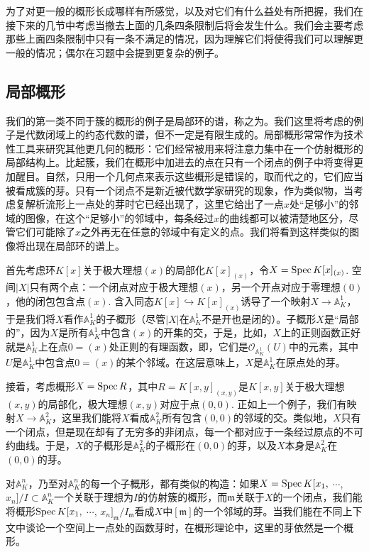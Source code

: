 为了对更一般的概形长成哪样有所感觉，以及对它们有什么益处有所把握，我们在接下来的几节中考虑当撤去上面的几条四条限制后将会发生什么。我们会主要考虑那些上面四条限制中只有一条不满足的情况，因为理解它们将使得我们可以理解更一般的情况；偶尔在习题中会提到更复杂的例子。

\subsection{局部概形}

我们的第一类不同于簇的概形的例子是局部环的谱，称之为。我们这里将考虑的例子是代数闭域上的约态代数的谱，但不一定是有限生成的。局部概形常常作为技术性工具来研究其他更几何的概形：它们经常被用来将注意力集中在一个仿射概形的局部结构上。比起簇，我们在概形中加进去的点在只有一个闭点的例子中将变得更加醒目。自然，只用一个几何点来表示这些概形是错误的，取而代之的，它们应当被看成簇的芽。只有一个闭点不是新近被代数学家研究的现象，作为类似物，当考虑复解析流形上一点处的芽时它已经出现了，这里它给出了一点$x$处“足够小”的邻域的图像，在这个“足够小”的邻域中，每条经过$x$的曲线都可以被清楚地区分，尽管它们可能除了$x$之外再无在任意的邻域中有定义的点。我们将看到这样类似的图像将出现在局部环的谱上。

首先考虑环$K[x]$关于极大理想$(x)$的局部化$K[x]_{(x)}$，令$X=\operatorname{Spec} K[x]_{(x)}$. 空间$|X|$只有两个点：一个闭点对应于极大理想$(x)$，另一个开点对应于零理想$(0)$，他的闭包包含点$(x)$. 含入同态$K[x]\hookrightarrow K[x]_{(x)}$诱导了一个映射$X\to \mathbb{A}_K^1$，于是我们将$X$看作$\mathbb{A}_K^1$的子概形（尽管$|X|$在$\mathbb{A}_K^1$不是开也是闭的）。子概形$X$是“局部的”，因为$X$是所有$\mathbb{A}_K^1$中包含$(x)$的开集的交，于是，比如，$X$上的正则函数正好就是$\mathbb{A}_K^1$上在点$0=(x)$处正则的有理函数，即，它们是$\mathscr{O}_{\mathbb{A}_K^1}(U)$中的元素，其中$U$是$\mathbb{A}_K^1$中包含点$0=(x)$的某个邻域。在这层意味上，$X$是$\mathbb{A}_K^1$在原点处的芽。

接着，考虑概形$X=\operatorname{Spec} R$，其中$R=K[x,y]_{(x,y)}$是$K[x,y]$关于极大理想$(x,y)$的局部化，极大理想$(x,y)$对应于点$(0,0)$. 正如上一个例子，我们有映射$X\to \mathbb{A}_K^2$，这里我们能将$X$看成$\mathbb{A}_K^2$所有包含$(0,0)$的邻域的交。类似地，$X$只有一个闭点，但是现在却有了无穷多的非闭点，每一个都对应于一条经过原点的不可约曲线。于是，$X$的子概形是$\mathbb{A}_K^2$的子概形在$(0,0)$的芽，以及$X$本身是$\mathbb{A}_K^2$在$(0,0)$的芽。

对$\mathbb{A}_K^n$，乃至对$\mathbb{A}_K^n$的每一个子概形，都有类似的构造：如果$X=\operatorname{Spec} K[x_1,$ $\cdots$, $x_n]/I\subset \mathbb{A}_K^n$一个关联于理想为$I$的仿射簇的概形，而$\mathfrak{m}$关联于$X$的一个闭点，我们能将概形$\operatorname{Spec} K[x_1,$ $\cdots$, $x_n]_\mathfrak{m}/I_{\mathfrak{m}}$看成$X$中$[\mathfrak{m}]$的一个邻域的芽。当我们能在不同上下文中谈论一个空间上一点处的函数芽时，在概形理论中，这里的芽依然是一个概形。

